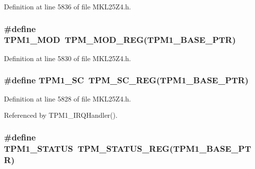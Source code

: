 Definition at line 5836 of file M\+K\+L25\+Z4.\+h.

\subsubsection[{\texorpdfstring{T\+P\+M1\+\_\+\+M\+OD}{TPM1_MOD}}]{\setlength{\rightskip}{0pt plus 5cm}\#define T\+P\+M1\+\_\+\+M\+OD~{\bf T\+P\+M\+\_\+\+M\+O\+D\+\_\+\+R\+EG}({\bf T\+P\+M1\+\_\+\+B\+A\+S\+E\+\_\+\+P\+TR})}\hypertarget{group___t_p_m___register___accessor___macros_ga67a3cba0336f4f9aff488c717a773cb4}{}\label{group___t_p_m___register___accessor___macros_ga67a3cba0336f4f9aff488c717a773cb4}


Definition at line 5830 of file M\+K\+L25\+Z4.\+h.

\subsubsection[{\texorpdfstring{T\+P\+M1\+\_\+\+SC}{TPM1_SC}}]{\setlength{\rightskip}{0pt plus 5cm}\#define T\+P\+M1\+\_\+\+SC~{\bf T\+P\+M\+\_\+\+S\+C\+\_\+\+R\+EG}({\bf T\+P\+M1\+\_\+\+B\+A\+S\+E\+\_\+\+P\+TR})}\hypertarget{group___t_p_m___register___accessor___macros_ga9f277042816804d50e51080d3d431c6f}{}\label{group___t_p_m___register___accessor___macros_ga9f277042816804d50e51080d3d431c6f}


Definition at line 5828 of file M\+K\+L25\+Z4.\+h.



Referenced by T\+P\+M1\+\_\+\+I\+R\+Q\+Handler().

\subsubsection[{\texorpdfstring{T\+P\+M1\+\_\+\+S\+T\+A\+T\+US}{TPM1_STATUS}}]{\setlength{\rightskip}{0pt plus 5cm}\#define T\+P\+M1\+\_\+\+S\+T\+A\+T\+US~{\bf T\+P\+M\+\_\+\+S\+T\+A\+T\+U\+S\+\_\+\+R\+EG}({\bf T\+P\+M1\+\_\+\+B\+A\+S\+E\+\_\+\+P\+TR})}\hypertarget{group___t_p_m___register___accessor___macros_ga0f7c5e7c3224c0d16d3676004e2d1982}{}\label{group___t_p_m___register___accessor___macros_ga0f7c5e7c3224c0d16d3676004e2d1982}


